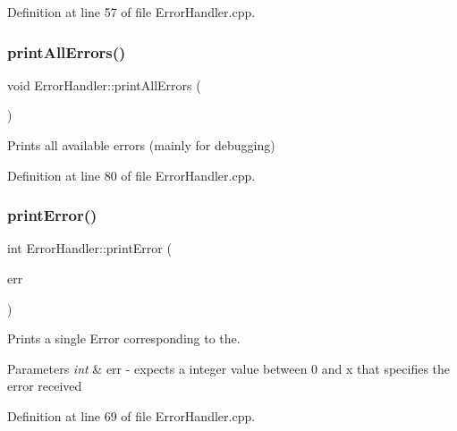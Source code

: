 Definition at line 57 of file Error\+Handler.\+cpp.

\mbox{\label{classErrorHandler_a1108324c221544c928a2de3a2cf9ba98}} 
\subsubsection{\texorpdfstring{printAllErrors()}{printAllErrors()}}
{\footnotesize\ttfamily void Error\+Handler\+::print\+All\+Errors (\begin{DoxyParamCaption}\item[{void}]{ }\end{DoxyParamCaption})}



Prints all available errors (mainly for debugging) 



Definition at line 80 of file Error\+Handler.\+cpp.

\mbox{\label{classErrorHandler_ab90b8248f24e3129df69d224585956dd}} 
\subsubsection{\texorpdfstring{printError()}{printError()}}
{\footnotesize\ttfamily int Error\+Handler\+::print\+Error (\begin{DoxyParamCaption}\item[{int}]{err }\end{DoxyParamCaption})}



Prints a single Error corresponding to the. 


\begin{DoxyParams}{Parameters}
{\em int} & err -\/ expects a integer value between 0 and x that specifies the error received \\
\hline
\end{DoxyParams}


Definition at line 69 of file Error\+Handler.\+cpp.

